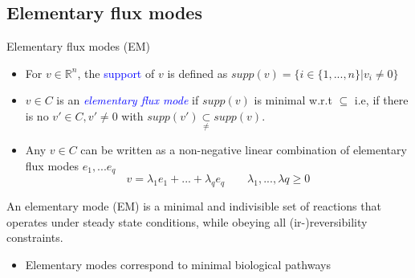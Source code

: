 \documentclass{beamer}
\begin{document}
\subsection{Elementary flux modes}

\begin{frame}{Elementary flux modes (EM)}
    \begin{itemize}
        \item For $v \in \mathbb{R}^n$, the \textcolor{blue}{support}
         of $v$ is defined as 
        $supp(v) = \{i \in \{1, ..., n \} | v_i \neq 0  \}$
        
        \item $v \in C$ is an \emph{\textcolor{blue}{elementary flux mode}} if $supp(v)$
        is minimal w.r.t $\subseteq$
        i.e, if there is no $v' \in C, v' \neq 0$ with 
        $supp(v') \underset{\neq}{\subset} supp(v)$. %
\pause
        \item Any $v \in C$ can be written as a non-negative linear 
        combination of elementary flux modes $e_{1}, ... e_{q}$
        $$v = \lambda_{1} e_{1} + ... + \lambda_{q} e_{q} 
        \quad\quad \lambda_{1}, ..., \lambda{q} \geq 0 $$ %
    \end{itemize}    
\pause
    \begin{block}{}
        An elementary mode (EM) is a minimal and indivisible set 
        of reactions that operates under steady state conditions, 
        while obeying all (ir-)reversibility constraints.
    \end{block}
    
    \begin{itemize}
    	\item Elementary modes correspond to minimal biological pathways
    \end{itemize}
    
\end{frame}
\end{document}
